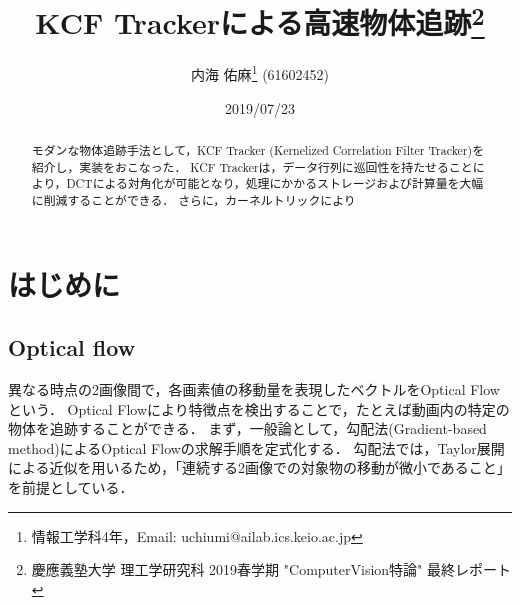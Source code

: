 \documentclass[11pt,a4j]{jarticle}
\title{{KCF Trackerによる高速物体追跡}\thanks{慶應義塾大学 理工学研究科 2019春学期 "ComputerVision特論" 最終レポート} \\ }
\author{内海 佑麻\thanks{情報工学科4年，Email: uchiumi@ailab.ics.keio.ac.jp} (61602452)}
\date{2019/07/23}
\begin{document}
  \maketitle
  \begin{abstract}
    モダンな物体追跡手法として，KCF Tracker (Kernelized Correlation Filter Tracker)を紹介し，実装をおこなった．
    KCF Trackerは，データ行列に巡回性を持たせることにより，DCTによる対角化が可能となり，処理にかかるストレージおよび計算量を大幅に削減することができる．
    さらに，カーネルトリックにより

  \end{abstract}
  \tableofcontents
  \section{はじめに}
    \subsection{Optical flow}
      異なる時点の2画像間で，各画素値の移動量を表現したベクトルをOptical Flowという．
      Optical Flowにより特徴点を検出することで，たとえば動画内の特定の物体を追跡することができる．
      まず，一般論として，勾配法(Gradient-based method)によるOptical Flowの求解手順を定式化する．
      勾配法では，Taylor展開による近似を用いるため，「連続する2画像での対象物の移動が微小であること」を前提としている．
\end{document}
